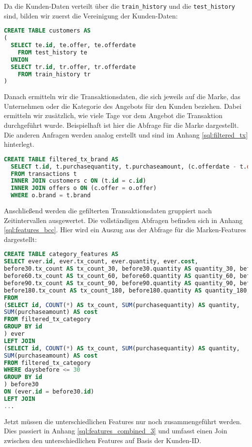 Da die Kunden-Daten verteilt über die \texttt{train\_history} und die \texttt{test\_history} sind, 
bilden wir zuerst die Vereinigung der Kunden-Daten:
\begin{lstlisting}[language=SQL]
CREATE TABLE customers AS 
(
  SELECT te.id, te.offer, te.offerdate
    FROM test_history te
  UNION
  SELECT tr.id, tr.offer, tr.offerdate
    FROM train_history tr 
)
\end{lstlisting}
Danach ermitteln wir die Transaktionsdaten, die sich jeweils auf die Marke, das Unternehmen oder 
die Kategorie des Angebots für den Kunden beziehen. Dabei ermitteln wir zusätzlich, wie viele
Tage vor dem Angebot die Transaktion durchgeführt wurde. Beispielhaft ist hier die Abfrage
für die Marke dargestellt. Die anderen Anfragen werden analog erstellt und sind im Anhang
\ref{sql:filtered_tx} hinterlegt.
\begin{lstlisting}[language=SQL]
CREATE TABLE filtered_tx_brand AS
  SELECT t.id, t.purchasequantity, t.purchaseamount, (c.offerdate - t.date) AS daysbefore 
  FROM transactions t 
  INNER JOIN customers c ON (t.id = c.id)
  INNER JOIN offers o ON (c.offer = o.offer)
  WHERE o.brand = t.brand
\end{lstlisting}

Anschließend werden die gefilterten Transaktionsdaten gruppiert nach
Zeitintervallen ausgewertet. Die vollständigen Abfragen befinden sich
in Anhang \ref{sql:features_bcc}. Hier wird ein Auszug aus der
Abfrage für die Marken-Features dargestellt:
\begin{lstlisting}[language=SQL]
CREATE TABLE category_features AS
SELECT ever.id, ever.tx_count, ever.quantity, ever.cost,
before30.tx_count AS tx_count_30, before30.quantity AS quantity_30, before30.cost AS cost_30,
before60.tx_count AS tx_count_60, before60.quantity AS quantity_60, before60.cost AS cost_60,
before90.tx_count AS tx_count_90, before90.quantity AS quantity_90, before90.cost AS cost_90,
before180.tx_count AS tx_count_180, before180.quantity AS quantity_180, before180.cost AS cost_180
FROM 
(SELECT id, COUNT(*) AS tx_count, SUM(purchasequantity) AS quantity, 
SUM(purchaseamount) AS cost
FROM filtered_tx_category
GROUP BY id
) ever
LEFT JOIN
(SELECT id, COUNT(*) AS tx_count, SUM(purchasequantity) AS quantity, 
SUM(purchaseamount) AS cost
FROM filtered_tx_category
WHERE daysbefore <= 30
GROUP BY id
) before30
ON (ever.id = before30.id)
LEFT JOIN
...
\end{lstlisting}

Jetzt müssen die unterschiedlichen Features nur noch zusammengeführt werden. Dies passiert
in Anhang \ref{sql:features_combined_3} und umfasst einen Join zwischen den
unterschiedlichen Features auf Basis der Kunden-ID.

